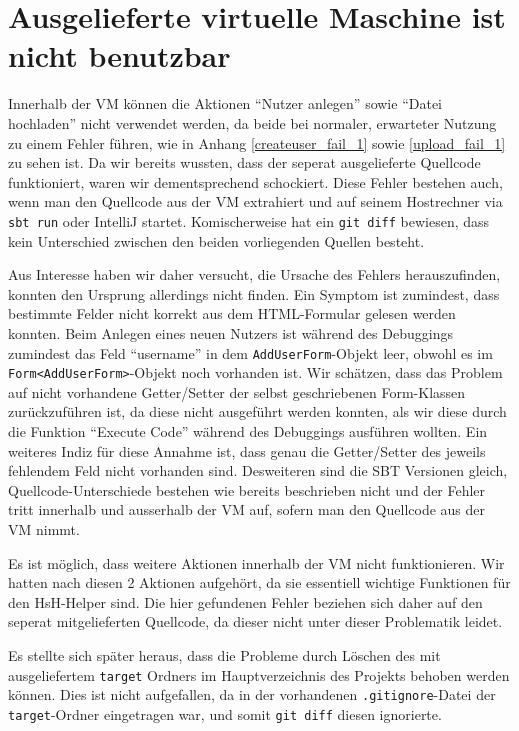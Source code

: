 \documentclass[12pt,DIV14,BCOR10mm,a4paper,parskip=half-,headsepline,headinclude,english,ngerman,bibliography=totocnumbered]{scrreprt}
\begin{document}
\vspace*{-3cm}

\tableofcontents  %

\chapter{Ausgelieferte virtuelle Maschine ist nicht benutzbar}

Innerhalb der VM können die Aktionen \enquote{Nutzer anlegen} sowie \enquote{Datei hochladen} nicht verwendet werden, da beide bei normaler, erwarteter Nutzung zu einem Fehler führen, wie in Anhang \ref{createuser_fail_1} sowie \ref{upload_fail_1} zu sehen ist.
Da wir bereits wussten, dass der seperat ausgelieferte Quellcode funktioniert, waren wir dementsprechend schockiert.
Diese Fehler bestehen auch, wenn man den Quellcode aus der VM extrahiert und auf seinem Hostrechner via \texttt{sbt run} oder IntelliJ startet.
Komischerweise hat ein \texttt{git diff} bewiesen, dass kein Unterschied zwischen den beiden vorliegenden Quellen besteht.

Aus Interesse haben wir daher versucht, die Ursache des Fehlers herauszufinden, konnten den Ursprung allerdings nicht finden.
Ein Symptom ist zumindest, dass bestimmte Felder nicht korrekt aus dem HTML-Formular gelesen werden konnten.
Beim Anlegen eines neuen Nutzers ist während des Debuggings zumindest das Feld \enquote{username} in dem \texttt{AddUserForm}-Objekt leer, obwohl es im \texttt{Form<AddUserForm>}-Objekt noch vorhanden ist.
Wir schätzen, dass das Problem auf nicht vorhandene Getter/Setter der selbst geschriebenen Form-Klassen zurückzuführen ist, da diese nicht ausgeführt werden konnten, als wir diese durch die Funktion \enquote{Execute Code} während des Debuggings ausführen wollten.
Ein weiteres Indiz für diese Annahme ist, dass genau die Getter/Setter des jeweils fehlendem Feld nicht vorhanden sind.
Desweiteren sind die SBT Versionen gleich, Quellcode-Unterschiede bestehen wie bereits beschrieben nicht und der Fehler tritt innerhalb und ausserhalb der VM auf, sofern man den Quellcode aus der VM nimmt.

Es ist möglich, dass weitere Aktionen innerhalb der VM nicht funktionieren. Wir hatten nach diesen 2 Aktionen aufgehört, da sie essentiell wichtige Funktionen für den HsH-Helper sind.
Die hier gefundenen Fehler beziehen sich daher auf den seperat mitgelieferten Quellcode, da dieser nicht unter dieser Problematik leidet.

Es stellte sich später heraus, dass die Probleme durch Löschen des mit ausgeliefertem \texttt{target} Ordners im Hauptverzeichnis des Projekts behoben werden können.
Dies ist nicht aufgefallen, da in der vorhandenen \texttt{.gitignore}-Datei der \texttt{target}-Ordner eingetragen war, und somit \texttt{git diff} diesen ignorierte.
\end{document}
